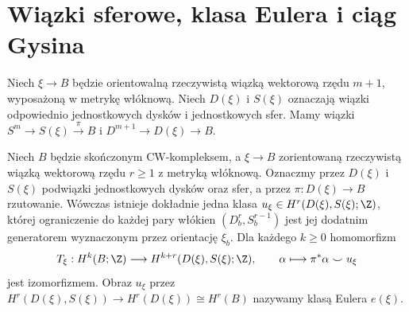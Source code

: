 \section{Wiązki sferowe, klasa Eulera i ciąg Gysina}
\begin{definicja}
Niech $\xi\to B$ będzie orientowalną rzeczywistą wiązką
wektorową rzędu $m+1$, wyposażoną w metrykę włóknową.
Niech $D(\xi)$ i $S(\xi)$ oznaczają wiązki odpowiednio
jednostkowych dysków i jednostkowych sfer. Mamy
wiązki $S^m\to S(\xi)\xrightarrow{\pi}B$ i
$D^{m+1}\to D(\xi)\to B$.
\end{definicja}
\begin{twierdzenie}
\label{thm:thom-v5}
Niech $B$ będzie skończonym CW-kompleksem, a
$\xi\to B$ zorientowaną rzeczywistą wiązką wektorową
rzędu $r\ge1$ z metryką włóknową. Oznaczmy przez
$D(\xi)$ i $S(\xi)$ podwiązki jednostkowych dysków
oraz sfer, a przez $\pi:D(\xi)\to B$ rzutowanie.
Wówczas istnieje dokładnie jedna klasa
$u_\xi\in H^r(D(\xi),S(\xi);\Z)$, której ograniczenie
do każdej pary włókien $(D^r_b,S^{r-1}_b)$ jest
jej dodatnim generatorem wyznaczonym przez orientację
$\xi_b$. Dla każdego $k\ge0$ homomorfizm
\[
T_\xi:H^k(B;\Z)\longrightarrow
H^{k+r}(D(\xi),S(\xi);\Z),\qquad
\alpha\longmapsto\pi^*\alpha\smile u_\xi
\]
jest izomorfizmem. Obraz $u_\xi$ przez
$H^r(D(\xi),S(\xi))\to H^r(D(\xi))\cong H^r(B)$
nazywamy klasą Eulera $e(\xi)$.
\end{twierdzenie}
